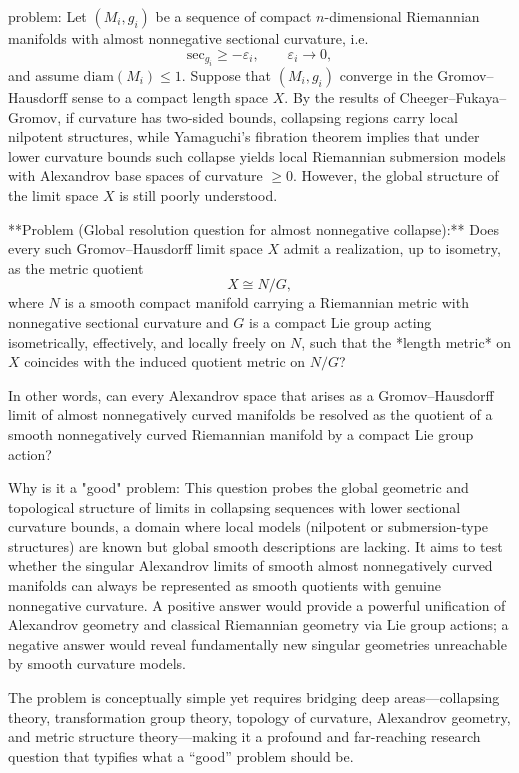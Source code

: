 problem:  
Let \((M_i, g_i)\) be a sequence of compact \(n\)-dimensional Riemannian manifolds with almost nonnegative sectional curvature, i.e.  
\[
\mathrm{sec}_{g_i} \ge -\varepsilon_i, \qquad \varepsilon_i \to 0,
\]
and assume \(\mathrm{diam}(M_i) \le 1\). Suppose that \((M_i, g_i)\) converge in the Gromov–Hausdorff sense to a compact length space \(X\).  
By the results of Cheeger–Fukaya–Gromov, if curvature has two-sided bounds, collapsing regions carry local nilpotent structures, while Yamaguchi’s fibration theorem implies that under lower curvature bounds such collapse yields local Riemannian submersion models with Alexandrov base spaces of curvature \(\ge 0\). However, the global structure of the limit space \(X\) is still poorly understood.

**Problem (Global resolution question for almost nonnegative collapse):**  
Does every such Gromov–Hausdorff limit space \(X\) admit a realization, up to isometry, as the metric quotient  
\[
X \cong N / G,
\]
where \(N\) is a smooth compact manifold carrying a Riemannian metric with nonnegative sectional curvature and \(G\) is a compact Lie group acting isometrically, effectively, and locally freely on \(N\), such that the *length metric* on \(X\) coincides with the induced quotient metric on \(N/G\)?  

In other words, can every Alexandrov space that arises as a Gromov–Hausdorff limit of almost nonnegatively curved manifolds be resolved as the quotient of a smooth nonnegatively curved Riemannian manifold by a compact Lie group action?

Why is it a "good" problem:  
This question probes the global geometric and topological structure of limits in collapsing sequences with lower sectional curvature bounds, a domain where local models (nilpotent or submersion-type structures) are known but global smooth descriptions are lacking. It aims to test whether the singular Alexandrov limits of smooth almost nonnegatively curved manifolds can always be represented as smooth quotients with genuine nonnegative curvature. A positive answer would provide a powerful unification of Alexandrov geometry and classical Riemannian geometry via Lie group actions; a negative answer would reveal fundamentally new singular geometries unreachable by smooth curvature models.  

The problem is conceptually simple yet requires bridging deep areas—collapsing theory, transformation group theory, topology of curvature, Alexandrov geometry, and metric structure theory—making it a profound and far-reaching research question that typifies what a “good” problem should be.